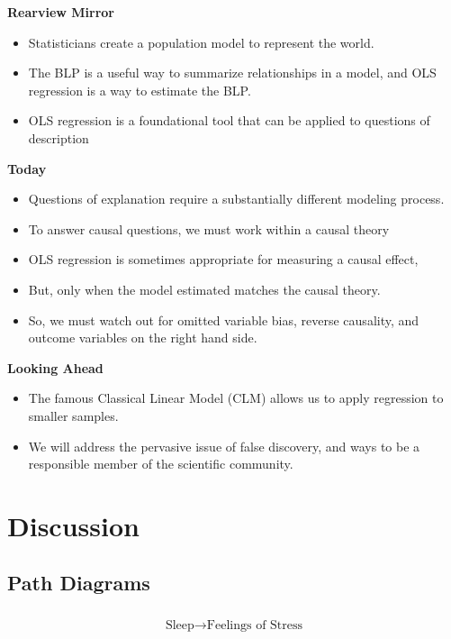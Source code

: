 \documentclass[
]{book}
\providecommand{\tightlist}{%
  \setlength{\itemsep}{0pt}\setlength{\parskip}{0pt}}
\theoremstyle{definition}
\theoremstyle{definition}
\theoremstyle{definition}
\theoremstyle{definition}
\theoremstyle{remark}
\begin{document}
\textbf{Rearview Mirror}

\begin{itemize}
\tightlist
\item
  Statisticians create a population model to represent the world.
\item
  The BLP is a useful way to summarize relationships in a model, and OLS regression is a way to estimate the BLP.
\item
  OLS regression is a foundational tool that can be applied to questions of description
\end{itemize}

\textbf{Today}

\begin{itemize}
\tightlist
\item
  Questions of explanation require a substantially different modeling process.
\item
  To answer causal questions, we must work within a causal theory
\item
  OLS regression is sometimes appropriate for measuring a causal effect,
\item
  But, only when the model estimated matches the causal theory.
\item
  So, we must watch out for omitted variable bias, reverse causality, and outcome variables on the right hand side.
\end{itemize}

\textbf{Looking Ahead}

\begin{itemize}
\tightlist
\item
  The famous Classical Linear Model (CLM) allows us to apply regression to smaller samples.
\item
  We will address the pervasive issue of false discovery, and ways to be a responsible member of the scientific community.
\end{itemize}

\section{Discussion}\label{discussion-1}

\subsection{Path Diagrams}\label{path-diagrams}

\[
\begin{matrix}
\\
\text{Sleep} \rightarrow \text{Feelings of Stress} \\
\\
\end{matrix}
\]
\end{document}
